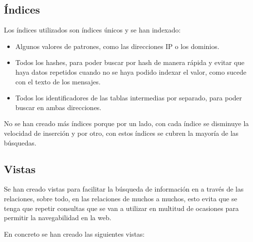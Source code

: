 \subsection{Índices} \label{imp:indices}
Los índices utilizados son índices únicos y se han indexado:

\begin{itemize}
    \item Algunos valores de patrones, como las direcciones IP o los dominios.
    \item Todos los hashes, para poder buscar por hash de manera rápida y evitar que haya datos repetidos cuando no se haya podido indexar el valor, como sucede con el texto de los mensajes.
    \item Todos los identificadores de las tablas intermedias por separado, para poder buscar en ambas direcciones.
\end{itemize}

No se han creado más índices porque por un lado, con cada índice se disminuye la velocidad de inserción \cite{mysql_index_optimitation} y por otro, con estos índices se cubren la mayoría de las búsquedas. 

\subsection{Vistas}
Se han creado vistas para facilitar la búsqueda de información en a través de las relaciones, sobre todo, en las relaciones de muchos a muchos, esto evita que se tenga que repetir consultas que se van a utilizar en multitud de ocasiones para permitir la navegabilidad en la web. 

En concreto se han creado las siguientes vistas:

